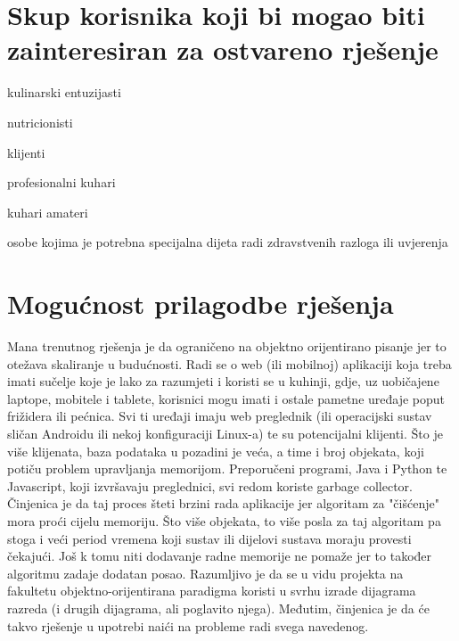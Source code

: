 	\section{Skup korisnika koji bi mogao biti zainteresiran za ostvareno rješenje}
	\begin{packed_item}
		\item kulinarski entuzijasti
		\item nutricionisti
		\item klijenti
		\item[]\begin{packed_item}
			\item profesionalni kuhari
			\item kuhari amateri
			\item osobe kojima je potrebna specijalna dijeta radi zdravstvenih razloga ili uvjerenja
		\end{packed_item}
	\end{packed_item}

	\section{Mogućnost prilagodbe rješenja}
	Mana trenutnog rješenja je da ograničeno na objektno orijentirano pisanje jer to otežava skaliranje u budućnosti. Radi se o web (ili mobilnoj) aplikaciji koja treba imati sučelje koje je lako za razumjeti i koristi se u kuhinji, gdje, uz uobičajene laptope, mobitele i tablete, korisnici mogu imati i ostale pametne uređaje poput frižidera ili pećnica. Svi ti uređaji imaju web preglednik (ili operacijski sustav sličan Androidu ili nekoj konfiguraciji Linux-a) te su potencijalni klijenti. Što je više klijenata, baza podataka u pozadini je veća, a time i broj objekata, koji potiču problem upravljanja memorijom. Preporučeni programi, Java i Python te Javascript, koji izvršavaju preglednici, svi redom koriste garbage collector. Činjenica je da taj proces šteti brzini rada aplikacije jer algoritam za "čišćenje" mora proći cijelu memoriju. Što više objekata, to više posla za taj algoritam pa stoga i veći period vremena koji sustav ili dijelovi sustava moraju provesti čekajući. Još k tomu niti dodavanje radne memorije ne pomaže jer to također algoritmu zadaje dodatan posao. Razumljivo je da se u vidu projekta na fakultetu objektno-orijentirana paradigma koristi u svrhu izrade dijagrama razreda (i drugih dijagrama, ali poglavito njega). Međutim, činjenica je da će takvo rješenje u upotrebi naići na probleme radi svega navedenog.


